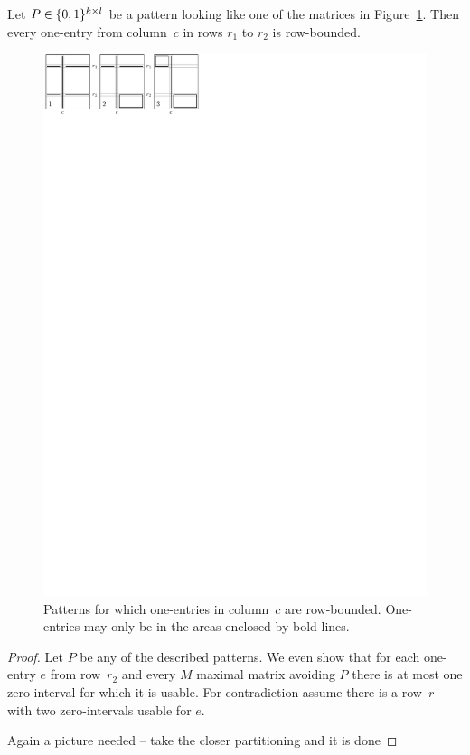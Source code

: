 \begin{lemma}
\label{lemmaI}
Let $P\in\{0,1\}^{k\times l}$ be a pattern looking like one of the matrices in Figure~\ref{lemmaIfig}. Then every one-entry from column~$c$ in rows $r_1$ to $r_2$ is row-bounded.
\begin{figure}[!ht]
\centering
\includegraphics[width=120mm]{img/lemmaI.pdf}
\caption{Patterns for which one-entries in column~$c$ are row-bounded. One-entries may only be in the areas enclosed by bold lines.}
\label{lemmaIfig}
\end{figure}
\end{lemma}
\begin{proof}
Let $P$ be any of the described patterns. We even show that for each one-entry $e$ from row~$r_2$ and every $M$ maximal matrix avoiding $P$ there is at most one zero-interval for which it is usable. For contradiction assume there is a row~$r$ with two zero-intervals usable for $e$.

Again a picture needed -- take the closer partitioning and it is done
\end{proof}

